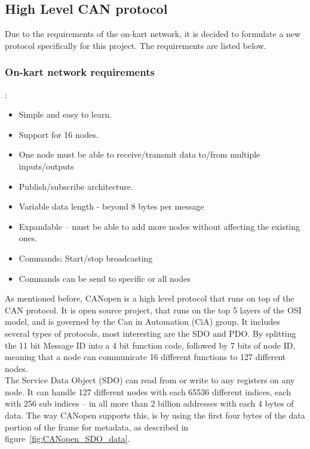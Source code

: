 
\subsection{High Level CAN protocol}\label{sub:CAN_protocol}
Due to the requirements of the on-kart network, it is decided to formulate a new protocol specifically for this project. The requirements are listed below.\\
\subsubsection{On-kart network requirements}:
\begin{itemize}
	\item Simple and easy to learn.
	\item Support for 16 nodes.
	\item One node must be able to receive/transmit data to/from multiple inputs/outputs
	\item Publish/subscribe architecture.
	\item Variable data length - beyond 8 bytes per message
	\item Expandable -- must be able to add more nodes without affecting the existing ones.
	\item Commands: Start/stop broadcasting 
	\item Commands can be send to specific or all nodes
\end{itemize}

\label{sub:CANopen}
As mentioned before, CANopen is a high level protocol that runs on top of the CAN protocol.
It is open source project, that runs on the top 5 layers of the OSI model\cite{CANopen_introduction}, and is governed by the Can in Automation (CiA) group.
It includes several types of protocols, most interesting are the SDO and PDO. 
By splitting the 11 bit Message ID into a 4 bit function code, followed by 7 bits of node ID, meaning that a node can communicate 16 different functions to 127 different nodes.\\
The Service Data Object (SDO) can read from or write to any registers on any node. 
It can handle 127 different nodes with each 65536 different indices, each with 256 sub indices -- in all more than 2 billion addresses with each 4 bytes of data.
The way CANopen supports this, is by using the first four bytes of the data portion of the frame for metadata, as described in figure~\ref{fig:CANopen_SDO_data}.

